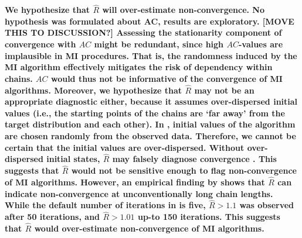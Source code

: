 \documentclass[article]{jss}
\begin{document}
\textbf{We hypothesize that $\widehat{R}$ will over-estimate non-convergence. No hypothesis was formulated about AC, results are exploratory.
%
[MOVE THIS TO DISCUSSION?] Assessing the stationarity component of convergence with $AC$ might be redundant, since high $AC$-values are implausible in MI procedures. That is, the randomness induced by the MI algorithm effectively mitigates the risk of dependency within chains. $AC$ would thus not be informative of the convergence of MI algorithms. 
%
Moreover, we hypothesize that $\widehat{R}$ may not be an appropriate diagnostic either, because it assumes over-dispersed initial values (i.e., the starting points of the chains are `far away' from the target distribution and each other). In , initial values of the algorithm are chosen randomly from the observed data. Therefore, we cannot be certain that the initial values are over-dispersed. %
Without over-dispersed initial states, $\widehat{R}$ may falsely diagnose convergence \citep{broo98}. %
This suggests that $\widehat{R}$ would not be sensitive enough to flag non-convergence of MI algorithms. However, an empirical finding by \cite{lace07} shows that $\widehat{R}$ can indicate non-convergence at unconventionally long chain lengths. While the default number of iterations in  is five, $\widehat{R} > 1.1$ was observed after 50 iterations, and $\widehat{R} > 1.01$ up-to 150 iterations. This suggests that $\widehat{R}$ would over-estimate non-convergence of MI algorithms. }


\end{document}
